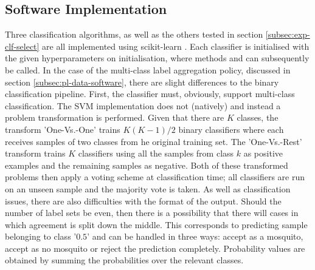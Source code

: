     \subsection{Software Implementation}
    \label{subsec:pl-clf-software}
        Three classification algorithms, as well as the others tested in section \ref{subsec:exp-clf-select} are all implemented using scikit-learn \cite{Pedregosa2012}. Each classifier is initialised with the given hyperparameters on  initialisation, where methods  and  can subsequently be called. In the case of the multi-class label aggregation policy, discussed in section \ref{subsec:pl-data-software}, there are slight differences to the binary classification pipeline. First, the classifier must, obviously, support multi-class classification. The SVM implementation does not (natively) and instead a problem transformation is performed. Given that there are $K$ classes, the transform 'One-Vs.-One' trains $K(K-1)/2$ binary classifiers where each receives samples of two classes from he original training set. The 'One-Vs.-Rest' transform trains $K$ classifiers using all the samples from class $k$ as positive examples and the remaining samples as negative. Both of these transformed problems then apply a voting scheme at classification time; all classifiers are run on an unseen sample and the majority vote is taken. As well as classification issues, there are also difficulties with the format of the output. Should the number of label sets be even, then there is a possibility that there will cases in which agreement is split down the middle. This corresponds to predicting sample belonging to class '$0.5$' and can be handled in three ways: accept as a mosquito, accept as no mosquito or reject the prediction completely. Probability values are obtained by summing the probabilities over the relevant classes.
